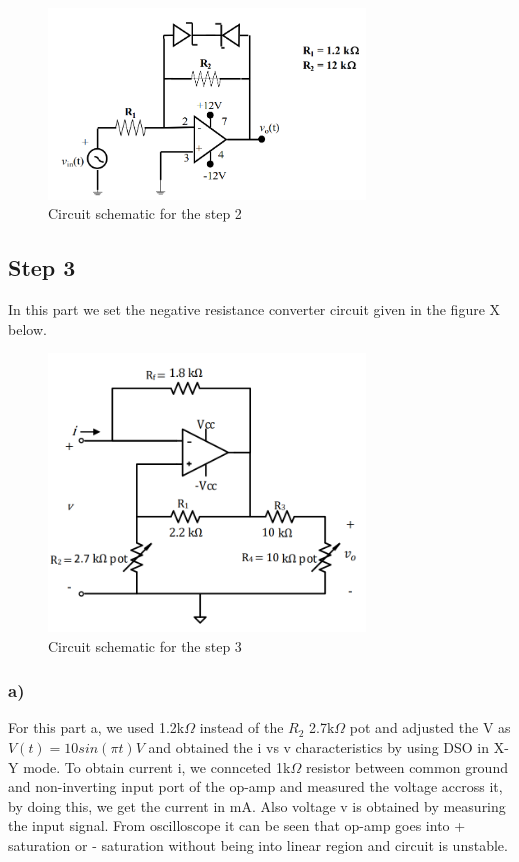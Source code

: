 \documentclass[letterpaper,12pt]{article}
\begin{document}
\begin{figure}[H]
    \centering
    \includegraphics[width = 0.75\textwidth]{2SCH.png}
    \caption{Circuit schematic for the step 2}
\end{figure} 

\subsection{Step 3}

In this part we set the negative resistance converter circuit given in the figure X below.
\begin{figure}[H]
    \centering
    \includegraphics[width = 0.75\textwidth]{3SCH.png}
    \caption{Circuit schematic for the step 3}
\end{figure} 

  
\subsubsection{a)}
For this part a, we used 1.2k\(\Omega\) instead of the \(R_2\) 2.7k\(\Omega\) pot and adjusted the V as \(V(t) = 10sin(\pi t)V\) and obtained the i vs v characteristics by using DSO in X-Y mode. To obtain current i, we connceted 1k\(\Omega\) resistor between common ground and non-inverting input port of the op-amp and measured the voltage accross it, by doing this, we get the current in mA. Also voltage v is obtained by measuring the input signal. From oscilloscope it can be seen that op-amp goes into + saturation or - saturation without being into linear region and circuit is unstable.
\end{document}
